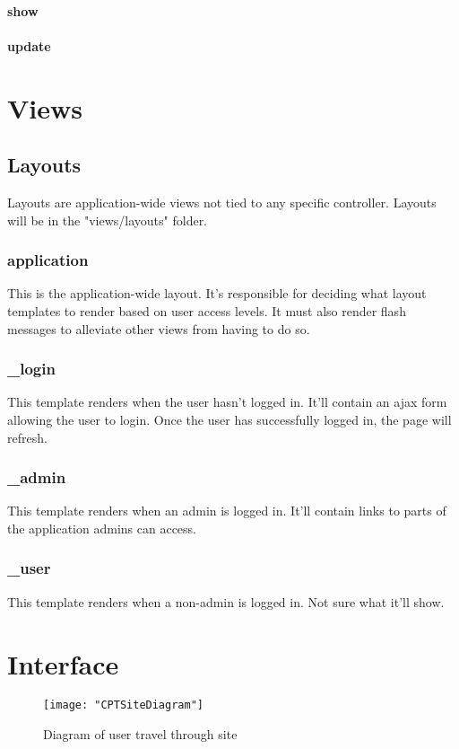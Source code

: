 \documentclass[12pt]{article}
\begin{document}
\paragraph{show}
\paragraph{update}


\section{Views}
\subsection{Layouts}
Layouts are application-wide views not tied to any specific controller. Layouts will be in the "views/layouts" folder.
\subsubsection{application}
This is the application-wide layout. It's responsible for deciding what layout templates to render based on user access levels.
It must also render flash messages to alleviate other views from having to do so.
\subsubsection{\_login}
This template renders when the user hasn't logged in. It'll contain an ajax form allowing the user to login.
Once the user has successfully logged in, the page will refresh.
\subsubsection{\_admin}
This template renders when an admin is logged in. It'll contain links to parts of the application admins can access.
\subsubsection{\_user}
This template renders when a non-admin is logged in. Not sure what it'll show.


\section{Interface}\label{sec:Interface}
\begin{figure}[H]
\begin{center}
\texttt{[image: "CPTSiteDiagram"]}
\caption{Diagram of user  travel through site}
\label{fig:dia}
\end{center}
\end{figure}
\end{document}

